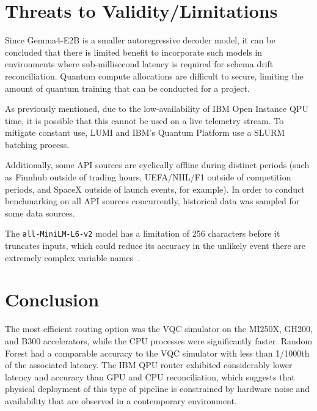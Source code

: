 \documentclass[journal]{IEEEtran}
\begin{document}

\section{Threats to Validity/Limitations}
Since Gemma4-E2B is a smaller autoregressive decoder model, it can be concluded that there is limited benefit to incorporate such models in environments where sub-millisecond latency is required for schema drift reconciliation. Quantum compute allocations are difficult to secure, limiting the amount of quantum training that can be conducted for a project. 

As previously mentioned, due to the low-availability of IBM Open Instance QPU time, it is possible that this cannot be used on a live telemetry stream. To mitigate constant use, LUMI and IBM's Quantum Platform use a SLURM batching process.

Additionally, some API sources are cyclically offline during distinct periods (such as Finnhub outside of trading hours, UEFA/NHL/F1 outside of competition periods, and SpaceX outside of launch events, for example). In order to conduct benchmarking on all API sources concurrently, historical data was sampled for some data sources.

The \texttt{all-MiniLM-L6-v2} model has a limitation of 256 characters before it truncates inputs, which could reduce its accuracy in the unlikely event there are extremely complex variable names~\cite{bert}.


\section{Conclusion}
The most efficient routing option was the VQC simulator on the MI250X, GH200, and B300 accelerators, while the CPU processes were significantly faster. Random Forest had a comparable accuracy to the VQC simulator with less than 1/1000th of the associated latency. The IBM QPU router exhibited considerably lower latency and accuracy than GPU and CPU reconciliation, which suggests that physical deployment of this type of pipeline is constrained by hardware noise and availability that are observed in a contemporary environment.
\end{document}

